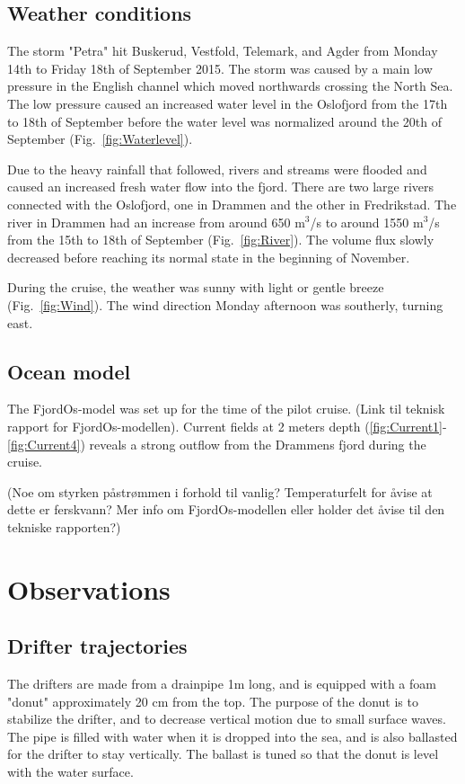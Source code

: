\documentclass[12pt,a4paper,english]{article}
\begin{document}
\subsection{Weather conditions}

The storm "Petra" hit Buskerud, Vestfold, Telemark, and Agder from Monday 14th to Friday 18th of September 2015. The storm was caused by a main low pressure in the English channel which moved northwards crossing the North Sea. The low pressure caused an increased water level in the Oslofjord from the 17th to 18th of September before the water level was normalized around the 20th of September (Fig.~\ref{fig:Waterlevel}).

Due to the heavy rainfall that followed, rivers and streams were flooded and caused an increased fresh water flow into the fjord. There are two large rivers connected with the Oslofjord, one in Drammen and the other in Fredrikstad. The river in Drammen had an increase from around 650 m$^3$/s to around 1550 m$^3$/s from the 15th to 18th of September (Fig.~\ref{fig:River}). The volume flux slowly decreased before reaching its normal state in the beginning of November. 

During the cruise, the weather was sunny with light or gentle breeze (Fig.~\ref{fig:Wind}). The wind direction Monday afternoon was southerly, turning east. 

\subsection{Ocean model}
The FjordOs-model was set up for the time of the pilot cruise. (Link til teknisk rapport for FjordOs-modellen). Current fields at 2 meters depth (\ref{fig:Current1}-\ref{fig:Current4}) reveals a strong outflow from the Drammens fjord during the cruise. 

(Noe om styrken p\aa str\o mmen i forhold til vanlig? Temperaturfelt for \aa vise at dette er ferskvann? Mer info om FjordOs-modellen eller holder det \aa vise til den tekniske rapporten?)


\clearpage

\section{Observations}


\subsection{Drifter trajectories}
The drifters are made from a drainpipe 1m long, and is equipped with a foam "donut" approximately 20 cm from the top. The purpose of the donut is to stabilize the drifter, and to decrease vertical motion due to small surface waves. The pipe is filled with water when it is dropped into the sea, and is also ballasted for the drifter to stay vertically. The ballast is tuned so that the donut is level with the water surface.
\end{document}
